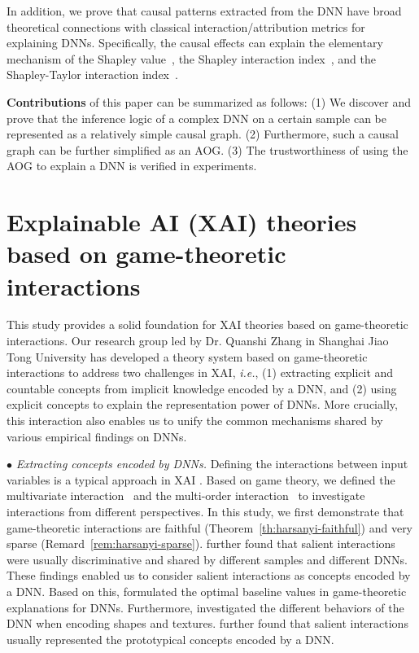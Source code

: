 \documentclass[10pt,twocolumn,letterpaper]{article}
\begin{document}
In addition, we prove that causal patterns extracted from the DNN have broad theoretical connections with classical interaction/attribution metrics for explaining DNNs.
Specifically, the causal effects can explain the elementary mechanism of the Shapley value~\cite{shapley1953value}, the Shapley interaction index~\cite{grabisch1999axiomatic}, and the Shapley-Taylor interaction index~\cite{sundararajan2020shapley}.


\textbf{Contributions} of this paper can be summarized as follows:
(1) We discover and prove that the inference logic of a complex DNN on a certain sample can be represented as a relatively simple causal graph.
(2) Furthermore, such a causal graph can be further simplified as an AOG.
(3) The trustworthiness of using the AOG to explain a DNN is verified in experiments.


\section{Explainable AI (XAI) theories based on game-theoretic interactions}
This study provides a solid foundation for XAI theories based on game-theoretic interactions. 
Our research group led by Dr. Quanshi Zhang in Shanghai Jiao Tong University has developed a theory system based on game-theoretic interactions to address two challenges in XAI, \emph{i.e.}, (1) extracting explicit and countable concepts from implicit knowledge encoded by a DNN, and (2) using explicit concepts to explain the representation power of DNNs.
More crucially, this interaction also enables us to unify the common mechanisms shared by various empirical findings on DNNs.


$\bullet$ \textit{Extracting concepts encoded by DNNs.} Defining the interactions between input variables is a typical approach in XAI \cite{sundararajan2020shapley,tsai2022faith}.
Based on game theory, we defined the multivariate interaction~\cite{zhangdie2021building,zhanghao2021interpreting} and the multi-order interaction~\cite{zhang2020interpreting} to investigate interactions from different perspectives.
In this study, we first demonstrate that game-theoretic interactions are faithful (Theorem~\ref{th:harsanyi-faithful}) and very sparse (Remard~\ref{rem:harsanyi-sparse}).
\cite{limingjie2023transferability} further found that salient interactions were usually discriminative and shared by different samples and different DNNs.
These findings enabled us to consider salient interactions as concepts encoded by a DNN.
Based on this, \cite{ren2021learning} formulated the optimal baseline values in game-theoretic explanations for DNNs.
Furthermore, \cite{chengxu2021concepts} investigated the different behaviors of the DNN when encoding shapes and textures.
\cite{chengxu2021hypothesis} further found that salient interactions usually represented the prototypical concepts encoded by a DNN.
\end{document}
